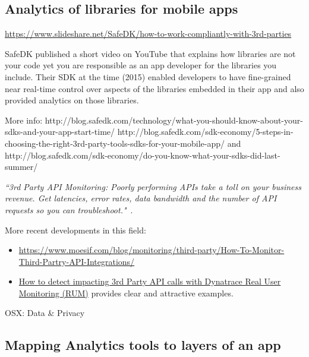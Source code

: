 \subsection{Analytics of libraries for mobile apps}
\url{https://www.slideshare.net/SafeDK/how-to-work-compliantly-with-3rd-parties}

SafeDK published a short video on YouTube that explains how libraries are not your code yet you are responsible as an app developer for the libraries you include. Their SDK at the time (2015) enabled developers to have fine-grained near real-time control over aspects of the libraries embedded in their app and also provided analytics on those libraries.

More info: 
http://blog.safedk.com/technology/what-you-should-know-about-your-sdks-and-your-app-start-time/
http://blog.safedk.com/sdk-economy/5-steps-in-choosing-the-right-3rd-party-tools-sdks-for-your-mobile-app/
and http://blog.safedk.com/sdk-economy/do-you-know-what-your-sdks-did-last-summer/

\emph{``3rd Party API Monitoring: Poorly performing APIs take a toll on your business revenue. Get latencies, error rates, data bandwidth and the number of API requests so you can troubleshoot."}~\citep{crittercism2015_homepage}.

More recent developments in this field:
\begin{itemize}
    \item \url{https://www.moesif.com/blog/monitoring/third-party/How-To-Monitor-Third-Partry-API-Integrations/}
    \item \href{https://www.dynatrace.com/news/blog/how-to-detect-impacting-3rd-party-api-calls-with-dynatrace-real-user-monitoring/}{How to detect impacting 3rd Party API calls with Dynatrace Real User Monitoring (RUM)} provides clear and attractive examples. 
\end{itemize}


OSX: Data \& Privacy

\subsection{Mapping Analytics tools to layers of an app}

